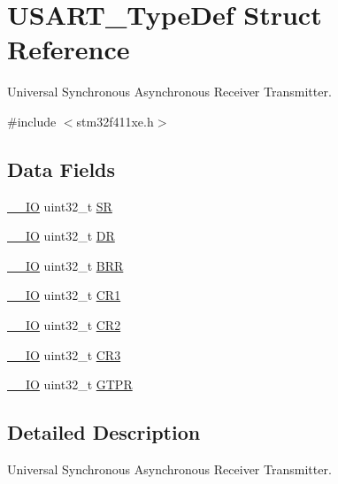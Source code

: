 \hypertarget{struct_u_s_a_r_t___type_def}{}\section{U\+S\+A\+R\+T\+\_\+\+Type\+Def Struct Reference}
\label{struct_u_s_a_r_t___type_def}


Universal Synchronous Asynchronous Receiver Transmitter.  




{\ttfamily \#include $<$stm32f411xe.\+h$>$}

\subsection*{Data Fields}
\begin{DoxyCompactItemize}
\item 
\hyperlink{core__sc300_8h_aec43007d9998a0a0e01faede4133d6be}{\+\_\+\+\_\+\+IO} uint32\+\_\+t \hyperlink{struct_u_s_a_r_t___type_def_a706005f59139b9ff8ee5755677e12bc7}{SR}
\item 
\hyperlink{core__sc300_8h_aec43007d9998a0a0e01faede4133d6be}{\+\_\+\+\_\+\+IO} uint32\+\_\+t \hyperlink{struct_u_s_a_r_t___type_def_a1db25b74d47af33dc4f4fe2177fc5da0}{DR}
\item 
\hyperlink{core__sc300_8h_aec43007d9998a0a0e01faede4133d6be}{\+\_\+\+\_\+\+IO} uint32\+\_\+t \hyperlink{struct_u_s_a_r_t___type_def_a6ef06ba9d8dc2dc2a0855766369fa7c9}{B\+RR}
\item 
\hyperlink{core__sc300_8h_aec43007d9998a0a0e01faede4133d6be}{\+\_\+\+\_\+\+IO} uint32\+\_\+t \hyperlink{struct_u_s_a_r_t___type_def_a6d7dcd3972a162627bc3470cbf992ec4}{C\+R1}
\item 
\hyperlink{core__sc300_8h_aec43007d9998a0a0e01faede4133d6be}{\+\_\+\+\_\+\+IO} uint32\+\_\+t \hyperlink{struct_u_s_a_r_t___type_def_aa7ede2de6204c3fc4bd9fb328801c99a}{C\+R2}
\item 
\hyperlink{core__sc300_8h_aec43007d9998a0a0e01faede4133d6be}{\+\_\+\+\_\+\+IO} uint32\+\_\+t \hyperlink{struct_u_s_a_r_t___type_def_af2991da9a4e1539530cd6b7b327199cc}{C\+R3}
\item 
\hyperlink{core__sc300_8h_aec43007d9998a0a0e01faede4133d6be}{\+\_\+\+\_\+\+IO} uint32\+\_\+t \hyperlink{struct_u_s_a_r_t___type_def_ae23acff49b4ff96fd29093e80fc7d72e}{G\+T\+PR}
\end{DoxyCompactItemize}


\subsection{Detailed Description}
Universal Synchronous Asynchronous Receiver Transmitter. 

